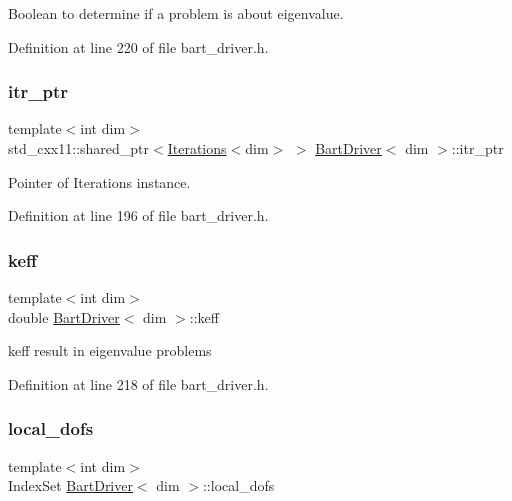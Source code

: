 Boolean to determine if a problem is about eigenvalue. 



Definition at line 220 of file bart\+\_\+driver.\+h.

\mbox{\label{class_bart_driver_ae07e7a592dd255d69685f17d98a2ecc6}} 
\subsubsection{\texorpdfstring{itr\+\_\+ptr}{itr\_ptr}}
{\footnotesize\ttfamily template$<$int dim$>$ \\
std\+\_\+cxx11\+::shared\+\_\+ptr$<$\hyperlink{class_iterations}{Iterations}$<$dim$>$ $>$ \hyperlink{class_bart_driver}{Bart\+Driver}$<$ dim $>$\+::itr\+\_\+ptr\hspace{0.3cm}{\ttfamily [private]}}



Pointer of Iterations instance. 



Definition at line 196 of file bart\+\_\+driver.\+h.

\mbox{\label{class_bart_driver_a459fab858171aa05e4618d6d9d327e87}} 
\subsubsection{\texorpdfstring{keff}{keff}}
{\footnotesize\ttfamily template$<$int dim$>$ \\
double \hyperlink{class_bart_driver}{Bart\+Driver}$<$ dim $>$\+::keff\hspace{0.3cm}{\ttfamily [private]}}



keff result in eigenvalue problems 



Definition at line 218 of file bart\+\_\+driver.\+h.

\mbox{\label{class_bart_driver_a06a4f83c6f9bea928ec311fcdf974ab1}} 
\subsubsection{\texorpdfstring{local\+\_\+dofs}{local\_dofs}}
{\footnotesize\ttfamily template$<$int dim$>$ \\
Index\+Set \hyperlink{class_bart_driver}{Bart\+Driver}$<$ dim $>$\+::local\+\_\+dofs\hspace{0.3cm}{\ttfamily [private]}}



